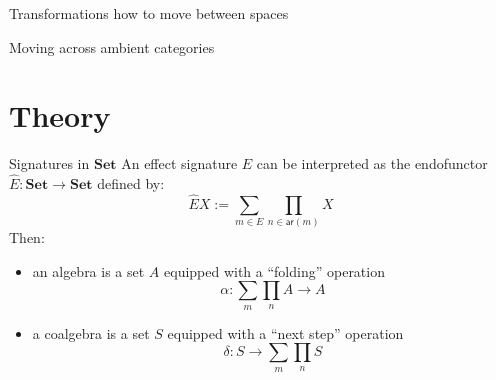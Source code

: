 \documentclass[aspectratio=1610,mathserif]{beamer}
\begin{document}
\begin{frame}{Transformations}
  how to move between spaces
\end{frame}

\begin{frame}{Moving across ambient categories}
\end{frame}

\section{Theory}
\frame\sectionpage


%
%

\begin{frame}{Signatures in $\mathbf{Set}$}
  An effect signature $E$ can be interpreted as the endofunctor
  $\hat{E} : \mathbf{Set} \rightarrow \mathbf{Set}$
  defined by:
  \[
     \hat{E}X := \sum_{m \in E} \prod_{n \in \mathsf{ar}(m)} X
  \]
  Then:
  \begin{itemize}
    \item an algebra is a set $A$ equipped with a ``folding'' operation
      \[ \alpha : \sum_m \prod_n A \rightarrow A \]
    \item a coalgebra is a set $S$ equipped with a ``next step'' operation
      \[ \delta : S \rightarrow \sum_m \prod_n S \]
  \end{itemize}
\end{frame}
\end{document}
